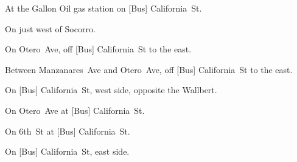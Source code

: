 
\begin{LocationList}

At the Gallon Oil gas station on [Bus]  California~St.

On  just west of Socorro.

On Otero~Ave, off [Bus]  California~St to the east.

Between Manzanares~Ave and Otero~Ave, off [Bus]  California~St to the east.

\Location{\RestArea \Rest}
On [Bus]  California~St, west side, opposite the Wallbert.

On Otero~Ave at [Bus]  California~St.

\Location{\TruckService \Service}
On 6th~St at [Bus] California~St.

On [Bus]  California~St, east side.

\end{LocationList}
